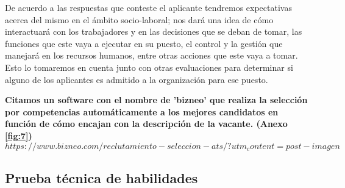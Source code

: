 \documentclass[letterpaper,12pt]{article}
\begin{document}
\begin{sloppypar}
De acuerdo a las respuestas que conteste el aplicante tendremos expectativas acerca del mismo en el ámbito socio-laboral; nos dará una idea de cómo interactuará con los trabajadores y en las decisiones que se deban de tomar, las funciones que este vaya a ejecutar en su puesto, el control y la gestión que manejará en los recursos humanos, entre otras acciones que este vaya a tomar. Esto lo tomaremos en cuenta junto con otras evaluaciones para determinar si alguno de los aplicantes es admitido a la organización para ese puesto.

\begin{center}
    \textbf{Citamos un software con el nombre de 'bizneo' que realiza la selección por competencias automáticamente a los mejores candidatos en función de cómo encajan con la descripción de la vacante. (Anexo \ref{fig:7}) }
    \vspace{0.3cm}\\ 
    $https://www.bizneo.com/reclutamiento-seleccion-ats/?utm_content=post-imagen$

\end{center}
\newpage

\subsection{Prueba técnica de habilidades}


\end{sloppypar}
\end{document}
